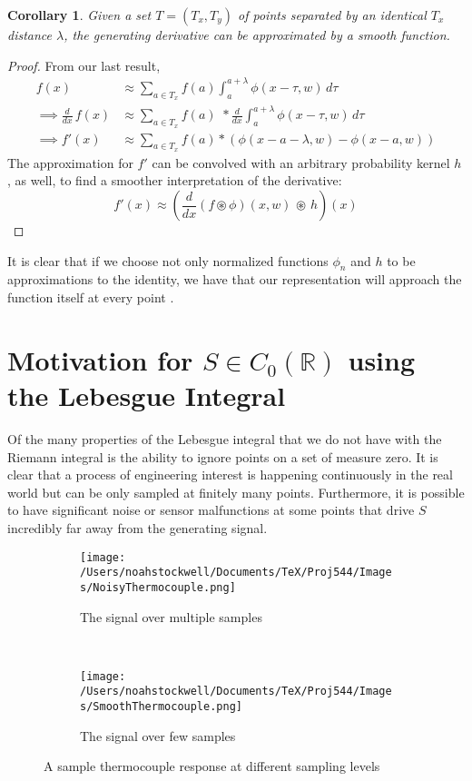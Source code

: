 \documentclass[11pt]{amsart}
\newtheorem{cor}[thm]{Corollary}
\theoremstyle{definition}
\theoremstyle{remark}
\begin{document}
\begin{cor}Given a set $T=(T_x, T_y)$ of points separated by an identical $T_x$ distance $\lambda$, the generating derivative can be approximated by a smooth function.
\end{cor}
\begin{proof}
From our last result,
\begin{align}
f(x)&\approx \displaystyle\sum_{a\in T_x} f(a)\displaystyle\int_a^{a+\lambda} \phi(x-\tau, w)\,d\tau\\
\implies \frac{d}{dx}\,f(x)&\approx \displaystyle\sum_{a\in T_x} f(a)\,\,* \frac{d}{dx}\int_a^{a+\lambda} \phi(x-\tau, w)\,d\tau\\
\implies f'(x) &\approx \displaystyle\sum_{a\in T_x} f(a) * \left( \phi(x-a-\lambda, w)-\phi(x-a, w) \right)
\end{align}
The approximation for $f'$ can be convolved with an arbitrary probability kernel $h$, as well, to find a smoother interpretation of the derivative:
\begin{equation}
f'(x)\approx \left(\frac{d}{dx} (f\circledast\phi)(x,w)\,\circledast\, h\right)(x)
\end{equation}
\end{proof}
It is clear that if we choose not only normalized functions $\phi_n$ and $h$ to be approximations to the identity, we have that our representation will approach the function itself at every point \cite{stein_real_2006}.
\newpage

\section{Motivation for $S\in C_0(\mathbb{R})$ using the Lebesgue Integral}
Of the many properties of the Lebesgue integral that we do not have with the Riemann integral is the ability to ignore points on a set of measure zero. It is clear that a process of engineering interest is happening continuously in the real world but can be only sampled at finitely many points. Furthermore, it is possible to have significant noise or sensor malfunctions at some points that drive $S$ incredibly far away from the generating signal.\\

\begin{figure}[H]
\centering
\begin{subfigure}[t]{0.5\textwidth}
	\centering
	\texttt{[image: /Users/noahstockwell/Documents/TeX/Proj544/Images/NoisyThermocouple.png]}
	\caption{The signal over multiple samples}
\end{subfigure}%
~ 
\begin{subfigure}[t]{0.5\textwidth}
	\centering
	\texttt{[image: /Users/noahstockwell/Documents/TeX/Proj544/Images/SmoothThermocouple.png]}
	\caption{The signal over few samples}
\end{subfigure}
\caption{A sample thermocouple response at different sampling levels}
\end{figure}
\end{document}
